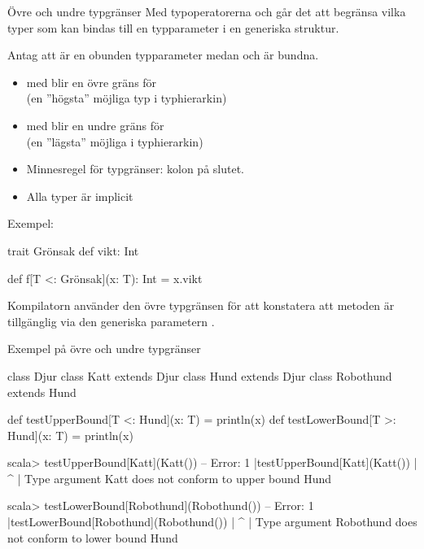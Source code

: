 \begin{Slide}{Övre och undre typgränser}\SlideFontSmall
Med typoperatorerna \code{<:} och \code{>:} går det att begränsa vilka typer som kan bindas till en typparameter i en generiska struktur. 

\vspace{0.5em}Antag att  är en obunden typparameter medan  och  är bundna. 
\begin{itemize}
  \item med  blir  en övre gräns  för \\(en ''högsta'' möjliga typ i  typhierarkin) 
  \item med  blir  en undre gräns  för \\(en ''lägsta'' möjliga i  typhierarkin) 
  \item Minnesregel för typgränser: kolon på slutet.
  \item Alla typer  är implicit 
\end{itemize} 
\pause

\vspace{0.5em}Exempel: 
\begin{Code}
  trait Grönsak { def vikt: Int }

  def f[T <: Grönsak](x: T): Int = x.vikt
\end{Code}

Kompilatorn använder den övre typgränsen för att konstatera att metoden  är tillgänglig via den generiska parametern .

\end{Slide}

\begin{Slide}{Exempel på övre och undre typgränser}

\begin{Code}
class Djur
class Katt extends Djur 
class Hund extends Djur
class Robothund extends Hund

def testUpperBound[T <: Hund](x: T) = println(x)
def testLowerBound[T >: Hund](x: T) = println(x)
\end{Code}

\begin{REPL}
scala> testUpperBound[Katt](Katt())
-- Error:
1 |testUpperBound[Katt](Katt())
  |          ^
  |          Type argument Katt does not conform to upper bound Hund

scala> testLowerBound[Robothund](Robothund())
-- Error:
1 |testLowerBound[Robothund](Robothund())
  |          ^
  |          Type argument Robothund does not conform to lower bound Hund
\end{REPL}

\end{Slide}


